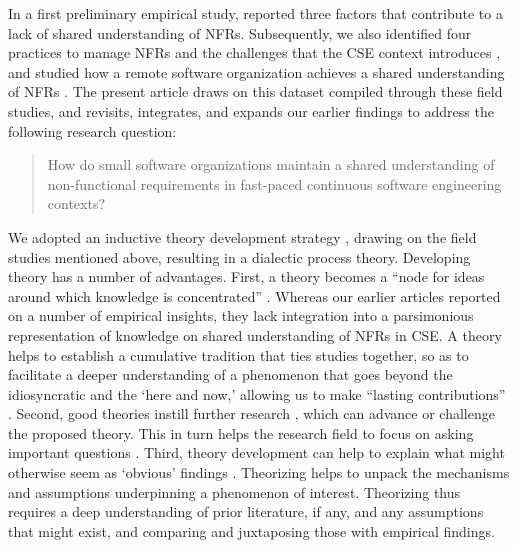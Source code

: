 \documentclass[smallextended]{svjour3}       %
\begin{document}
In a first preliminary empirical study, \cite{werner2020re} reported three factors that contribute to a lack of shared understanding of NFRs. 
Subsequently, we also identified four practices to manage NFRs and the challenges that the CSE context introduces \citep{werner_tse_2021}, and studied how a remote software organization achieves a shared understanding of NFRs \citep{okpara_re2022,okpara_rej2023}. 
The present article draws on this dataset compiled through these field studies, and revisits, integrates, and expands our earlier findings to address the following research question:

\begin{quote}
\normalsize  
    How do small software organizations maintain a shared understanding of non-functional requirements in fast-paced continuous software engineering contexts?
\end{quote}

We adopted an inductive theory development strategy \citep{stol2018abc}, drawing on the field studies mentioned above, resulting in a dialectic process theory. 
Developing theory has a number of advantages. First, a theory becomes a ``node for ideas around which knowledge is concentrated'' \cite[p. xi]{miner2015organizational}. Whereas our earlier articles reported on a number of empirical insights, they lack integration into a parsimonious representation of knowledge on shared understanding of NFRs in CSE. A theory helps to establish a cumulative tradition that ties studies together, so as to facilitate a deeper understanding of a phenomenon that goes beyond the idiosyncratic and the `here and now,' allowing us to make ``lasting contributions'' \citep{stol2024theorizing}. 
Second, good theories instill further research \citep{miner2015organizational}, which can advance or challenge the proposed theory. This in turn helps the research field to focus on asking important questions \citep{stol2024theorizing}.
Third, theory development can help to explain what might otherwise seem as `obvious' findings \citep{stol2024theorizing}. Theorizing helps to unpack the mechanisms and assumptions underpinning a phenomenon of interest. Theorizing thus requires a deep understanding of prior literature, if any, and any assumptions that might exist, and comparing and juxtaposing those with empirical findings. 
\end{document}
